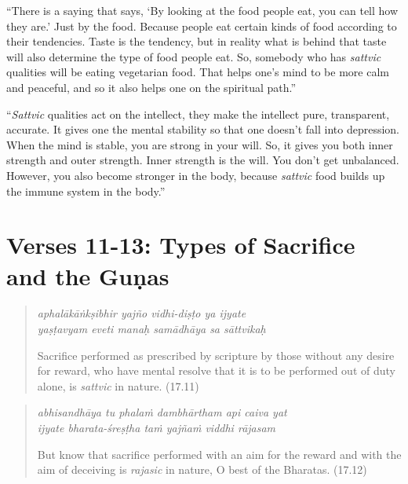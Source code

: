 \documentclass[12pt, twoside, openright]{memoir}
\begin{document}
\enquote{There is a saying that says, \enquote{By looking at the food people eat, you can tell how they are.} Just by the food. Because people eat certain kinds of food according to their tendencies. Taste is the tendency, but in reality what is behind that taste will also determine the type of food people eat. So, somebody who has \textit{sattvic} qualities will be eating vegetarian food. That helps one’s mind to be more calm and peaceful, and so it also helps one on the spiritual path.}

\enquote{\textit{Sattvic} qualities act on the intellect, they make the intellect pure, transparent, accurate. It gives one the mental stability so that one doesn’t fall into depression. When the mind is stable, you are strong in your will. So, it gives you both inner strength and outer strength. Inner strength is the will. You don’t get unbalanced. However, you also become stronger in the body, because \textit{sattvic} food builds up the immune system in the body.}

\section{Verses 11-13: Types of Sacrifice and the Guṇas}\label{sec-verses-11-13-types-of-sacrifice-and-the-gunas}


\par
\begin{verse}
\textit{aphalākāṅkṣibhir yajño vidhi-diṣṭo ya ijyate} \\
\textit{yaṣṭavyam eveti manaḥ samādhāya sa sāttvikaḥ}

\noindent Sacrifice performed as prescribed by scripture by those without any desire for reward, who have mental resolve that it is to be performed out of duty alone, is \textit{sattvic} in nature. (17.11)
\end{verse}
\par




\par
\begin{verse}
\textit{abhisandhāya tu phalaṁ dambhārtham api caiva yat} \\
\textit{ijyate bharata-śreṣṭha taṁ yajñaṁ viddhi rājasam}

\noindent But know that sacrifice performed with an aim for the reward and with the aim of deceiving is \textit{rajasic} in nature, O best of the Bharatas. (17.12)
\end{verse}
\par
\end{document}
